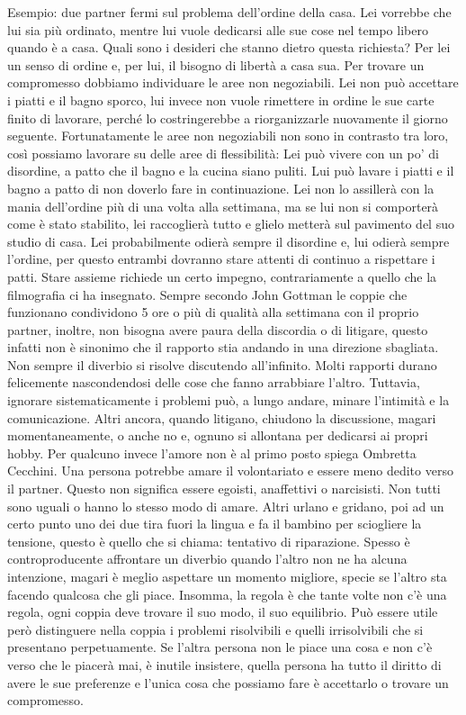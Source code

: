 \documentclass[12pt]{book} %
\begin{document}
Esempio: due partner fermi sul problema dell'ordine della casa. Lei vorrebbe che lui sia più ordinato,
mentre lui vuole dedicarsi alle sue cose nel tempo libero quando è a casa. Quali sono i desideri che stanno dietro
questa richiesta? Per lei un senso di ordine e, per lui, il bisogno di libertà a casa sua. Per trovare un compromesso
dobbiamo individuare le aree non negoziabili. Lei non può accettare i piatti e il bagno sporco, lui invece non vuole
rimettere in ordine le sue carte finito di lavorare, perché lo costringerebbe a riorganizzarle nuovamente il giorno
seguente. Fortunatamente le aree non negoziabili non sono in contrasto tra loro, così possiamo lavorare su delle aree
di flessibilità: Lei può vivere con un po' di disordine, a patto che il bagno e la cucina siano
puliti. Lui può lavare i piatti e il bagno a patto di non doverlo fare in continuazione. Lei non lo assillerà con la
mania dell'ordine più di una volta alla settimana, ma se lui non si comporterà come è stato
stabilito, lei raccoglierà tutto e glielo metterà sul pavimento del suo studio di casa. Lei probabilmente odierà sempre il disordine
e, lui odierà sempre l'ordine, per questo entrambi dovranno stare attenti di continuo a rispettare
i patti. Stare assieme richiede un certo impegno, contrariamente a quello che la filmografia ci ha insegnato. Sempre secondo John Gottman le coppie che funzionano condividono 5 ore o più di qualità alla settimana con il proprio partner,
inoltre, non bisogna avere paura della discordia o di litigare, questo infatti non è sinonimo che il rapporto stia
andando in una direzione sbagliata. Non sempre il diverbio si risolve discutendo all'infinito.
Molti rapporti durano felicemente nascondendosi delle cose che fanno arrabbiare l'altro. 
Tuttavia, ignorare sistematicamente i problemi può, a lungo andare, minare l’intimità e la comunicazione.
Altri ancora, quando litigano, chiudono la discussione, magari momentaneamente, o anche no e, ognuno si allontana per
dedicarsi ai propri hobby. Per qualcuno invece l'amore non è al primo posto spiega Ombretta
Cecchini. Una persona
potrebbe amare il volontariato e essere meno dedito verso il partner. Questo non significa essere egoisti, anaffettivi
o narcisisti. Non tutti sono uguali o hanno lo stesso modo di amare. Altri urlano e gridano, poi ad un certo punto uno
dei due tira fuori la lingua e fa il bambino per sciogliere la tensione, questo è quello che si chiama: tentativo di
riparazione. Spesso è controproducente affrontare un diverbio quando l'altro non ne ha alcuna
intenzione, magari è meglio aspettare un momento migliore, specie se l'altro sta facendo qualcosa
che gli piace. Insomma, la regola è che tante volte non c'è una regola, ogni coppia deve trovare
il suo modo, il suo equilibrio. Può essere utile però distinguere nella coppia i problemi risolvibili e quelli irrisolvibili che si presentano perpetuamente. Se l'altra persona non le piace una cosa e non c'è verso che le piacerà mai, è inutile insistere, quella persona ha tutto il diritto di avere le sue preferenze e l'unica cosa che possiamo fare è accettarlo o trovare un compromesso. 
\end{document}
